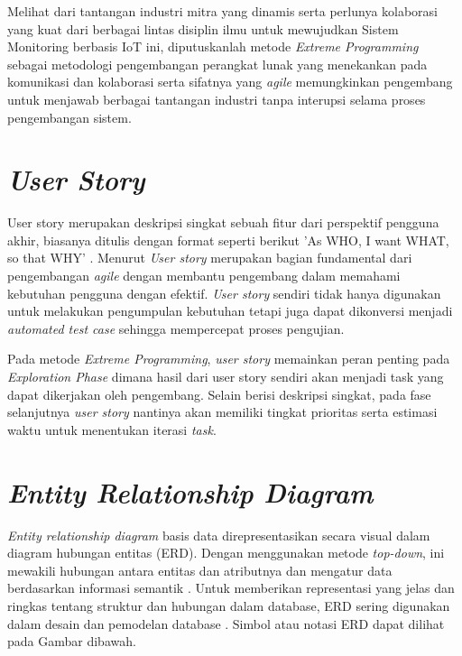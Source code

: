 Melihat dari tantangan industri mitra yang dinamis serta perlunya kolaborasi yang kuat dari berbagai lintas disiplin ilmu untuk mewujudkan Sistem Monitoring berbasis IoT ini, diputuskanlah metode \textit{Extreme Programming} sebagai metodologi pengembangan perangkat lunak yang menekankan pada komunikasi dan kolaborasi serta sifatnya yang \textit{agile} memungkinkan pengembang untuk menjawab berbagai tantangan industri tanpa interupsi selama proses pengembangan sistem.

\section{\textit{User Story}}

User story merupakan deskripsi singkat sebuah fitur dari perspektif pengguna akhir, biasanya ditulis dengan format seperti berikut 'As WHO, I want WHAT, so that WHY' \parencite{article:dwitama}.  Menurut \textcite{inproc:raharjana} \textit{User story} merupakan bagian fundamental dari pengembangan \textit{agile} dengan membantu pengembang dalam memahami kebutuhan pengguna dengan efektif. \textit{User story} sendiri tidak hanya digunakan untuk melakukan pengumpulan kebutuhan tetapi juga dapat dikonversi menjadi
\textit{automated test case} sehingga mempercepat proses pengujian.

Pada metode \textit{Extreme Programming}, \textit{user story} memainkan peran penting pada \textit{Exploration Phase} dimana hasil dari user story sendiri akan menjadi task yang dapat dikerjakan oleh pengembang. Selain berisi deskripsi singkat, pada fase selanjutnya \textit{user story} nantinya akan memiliki tingkat prioritas serta estimasi waktu untuk menentukan iterasi \textit{task}.

\section{\textit{Entity Relationship Diagram}}

\textit{Entity relationship diagram} basis data direpresentasikan secara visual dalam diagram hubungan entitas (ERD). Dengan menggunakan metode \textit{top-down}, ini mewakili hubungan antara entitas dan atributnya dan mengatur data berdasarkan informasi semantik \parencite{article:chen}. Untuk memberikan representasi yang jelas dan ringkas tentang struktur dan hubungan dalam database, ERD sering digunakan dalam desain dan pemodelan database \parencite{article:supriyadi}. Simbol atau notasi ERD dapat dilihat pada Gambar dibawah.

